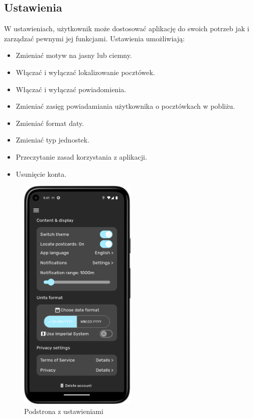 \documentclass[a4paper,twoside,12pt]{book}
\begin{document}
\subsection{Ustawienia}
W ustawieniach, użytkownik może dostosować aplikację do swoich potrzeb jak i zarządzać pewnymi jej funkcjami. 
Ustawienia umożliwiają:
\begin{itemize}
    \item Zmieniać motyw na jasny lub ciemny.
    \item Włączać i wyłączać lokalizowanie pocztówek.
    \item Włączać i wyłączać powiadomienia.
    \item Zmieniać zasięg powiadamiania użytkownika o pocztówkach w pobliżu.
    \item Zmieniać format daty.
    \item Zmieniać typ jednostek.
    \item Przeczytanie zasad korzystania z aplikacji.
    \item Usunięcie konta.
\end{itemize}

\begin{figure}[H]
    \centering
    \includegraphics[width=0.5\textwidth]{mobile_ss/ustawienia.png}
    \caption{Podstrona z ustawieniami}
\end{figure}
\end{document}
